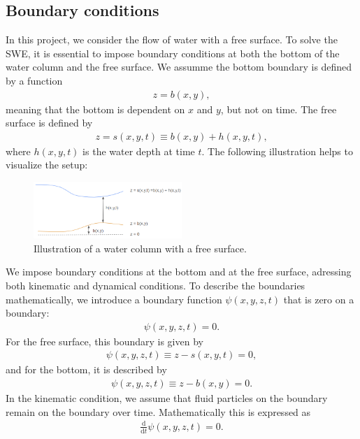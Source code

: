\subsection{Boundary conditions}
In this project, we consider the flow of water with a free surface.
To solve the SWE, it is essential to impose boundary conditions at both the bottom of the water column and the free surface.
We assumme the bottom boundary is defined by a function
\begin{align*}
    z = b(x,y),
\end{align*}
meaning that the bottom is dependent on $x$ and $y$, but not on time.
The free surface is defined by 
\begin{align*}
    z = s(x,y,t) \equiv b(x,y) + h(x,y,t),
\end{align*}
where $h(x,y,t)$ is the water depth at time $t$.
The following illustration helps to visualize the setup:
\begin{figure}[H]
    \centering
    \includegraphics[width=0.5\textwidth]{figs/water-column-bc.png}
    \caption{Illustration of a water column with a free surface.}\label{fig:water_column_bc}
\end{figure}
We impose boundary conditions at the bottom and at the free surface, adressing both kinematic and dynamical conditions.
To describe the boundaries mathematically, we introduce a boundary function $\psi(x,y,z,t)$ that is zero on a boundary:
\begin{align*}
    \psi(x,y,z,t) = 0.
\end{align*}
For the free surface, this boundary is given by
\begin{align}\label{eq:psi_free_surface}
    \psi(x,y,z,t) \equiv z - s(x,y,t) = 0,
\end{align}
and for the bottom, it is described by
\begin{align}\label{eq:psi_bottom}
    \psi(x,y,z,t) \equiv z - b(x,y) = 0.
\end{align}
In the kinematic condition, we assume that fluid particles on the boundary remain on the boundary over time.
Mathematically this is expressed as
\begin{align*}
    \frac{\text{d} }{\text{d} t} \psi(x,y,z,t) = 0.
\end{align*}
